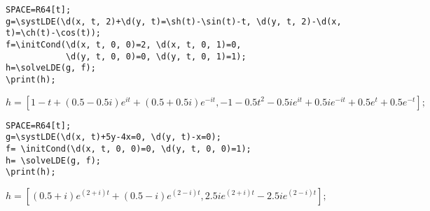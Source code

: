 \begin{verbatim}
SPACE=R64[t];
g=\systLDE(\d(x, t, 2)+\d(y, t)=\sh(t)-\sin(t)-t, \d(y, t, 2)-\d(x, t)=\ch(t)-\cos(t));
f=\initCond(\d(x, t, 0, 0)=2, \d(x, t, 0, 1)=0, 
            \d(y, t, 0, 0)=0, \d(y, t, 0, 1)=1);
h=\solveLDE(g, f); 
\print(h);
\end{verbatim}

{$h = [1-t+(0.5-0.5i)e^{it}+(0.5+0.5i)e^{-it},
-1-0.5t^{2}-0.5ie^{it}+0.5ie^{-it}+0.5e^{t}+0.5e^{-t}];$}


\begin{verbatim}
SPACE=R64[t];
g=\systLDE(\d(x, t)+5y-4x=0, \d(y, t)-x=0);
f= \initCond(\d(x, t, 0, 0)=0, \d(y, t, 0, 0)=1);
h= \solveLDE(g, f);  
\print(h);
\end{verbatim}

{$h = [(0.5+i)e^{(2+i)t}+(0.5-i)e^{(2-i)t},
2.5ie^{(2+i)t}-2.5ie^{(2-i)t}];$}


